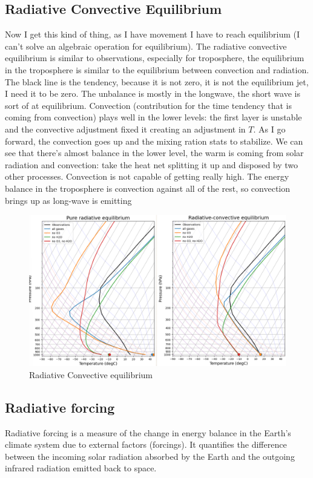 \subsection{Radiative Convective Equilibrium}
Now I get this kind of thing, as I have movement I have to reach equilibrium (I can't solve an algebraic operation for equilibrium). The radiative convective equilibrium is similar to observations, especially for troposphere, the equilibrium in the troposphere is similar to the equilibrium between convection and radiation. The black line is the tendency, because it is not zero, it is not the equilibrium jet, I need it to be zero. The unbalance is mostly in the longwave, the short wave is sort of at equilibrium. Convection (contribution for the time tendency that is coming from convection) plays well in the lower levels: the first layer is unstable and the convective adjustment fixed it creating an adjustment in $T$. As I go forward, the convection goes up and the mixing ration stats to stabilize. We can see that there's almost balance in the lower level, the warm is coming from solar radiation and convection: take the heat net splitting it up and disposed by two other processes. Convection is not capable of getting really high. The energy balance in the troposphere is convection against all of the rest, so convection brings up as long-wave is emitting
\begin{figure}[h!]
	\centering
	\includegraphics[width=0.5\linewidth]{uploads/Screenshot 2024-11-20 131319.png}
	\caption{Radiative Convective equilibrium}
	\label{fig:enter-label}
\end{figure}
\subsection{Radiative forcing}
Radiative forcing is a measure of the change in energy balance in the Earth's climate system due to external factors (forcings). It quantifies the difference between the incoming solar radiation absorbed by the Earth and the outgoing infrared radiation emitted back to space.



